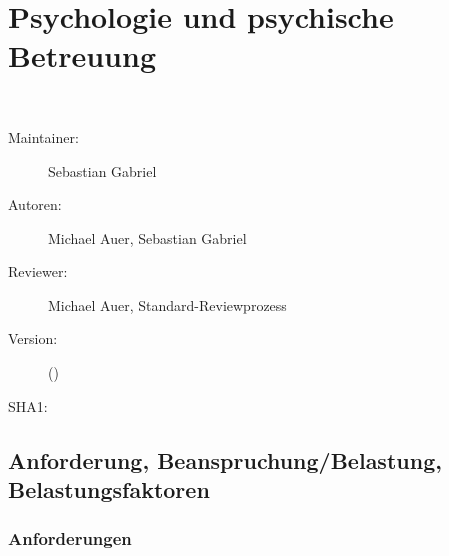 ﻿%
\def\ChapterCode{PSI}
\chapter
[\CO{[PSI]} Psychologie und psychische Betreuung]
{Psychologie und psychische Betreuung}
\label{chp:PSY}

\ChapterIntro
{%
~~~
}
{%
\begin{description}
  \item[Maintainer:] Sebastian Gabriel
  \item[Autoren:] Michael Auer, Sebastian Gabriel
  \item[Reviewer:] Michael Auer, Standard-Reviewprozess
  \item[Version:] {\DocVersion} ({\DocVersionInfo})
  \item[SHA1:] {\DocGitCommit}
\end{description}

{\TxTeilkapitelAASS}
}



\clearpage
\section{Anforderung, Beanspruchung/Belastung, Belastungsfaktoren}

\subsection{Anforderungen} 

